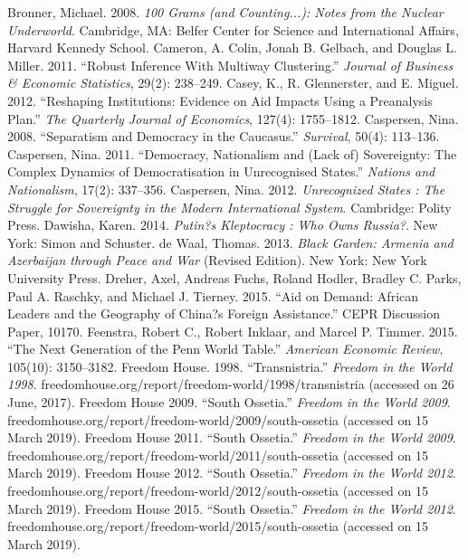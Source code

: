 \documentclass[12pt,a4paper]{article}%
\begin{document}
\begin{thebibliography}{99}
\bibitem{} Bronner, Michael. 2008. \textit{100 Grams (and Counting...): Notes from the Nuclear Underworld}. Cambridge, MA: Belfer Center for Science and International Affairs, Harvard Kennedy School.                                                                             
\bibitem{} Cameron, A. Colin, Jonah B. Gelbach, and Douglas L. Miller. 2011. ``Robust Inference With Multiway Clustering.'' \textit{Journal of Business \& Economic Statistics}, 29(2): 238--249.
\bibitem{} Casey, K., R. Glennerster, and E. Miguel. 2012. ``Reshaping Institutions: Evidence on Aid Impacts Using a Preanalysis Plan.'' \textit{The Quarterly Journal of Economics}, 127(4): 1755--1812.
\bibitem{} Caspersen, Nina. 2008. ``Separatism and Democracy in the Caucasus.'' \textit{Survival}, 50(4): 113--136.
\bibitem{} Caspersen, Nina. 2011. ``Democracy, Nationalism and (Lack of) Sovereignty: The Complex Dynamics of Democratisation in Unrecognised States.'' \textit{Nations and Nationalism}, 17(2): 337--356.
\bibitem{} Caspersen, Nina. 2012. \textit{Unrecognized States : The Struggle for Sovereignty in the Modern International System}. Cambridge: Polity Press.
\bibitem{} Dawisha, Karen. 2014. \textit{Putin?s Kleptocracy : Who Owns Russia?}. New York: Simon and Schuster.
\bibitem{} de Waal, Thomas. 2013. \textit{Black Garden: Armenia and Azerbaijan through Peace and War} (Revised Edition). New York: New York University Press.
\bibitem{} Dreher, Axel, Andreas Fuchs, Roland Hodler, Bradley C. Parks, Paul A. Raschky, and Michael J. Tierney. 2015. ``Aid on Demand: African Leaders and the Geography of China?s Foreign Assistance.'' CEPR Discussion Paper, 10170.
\bibitem{} Feenstra, Robert C., Robert Inklaar, and Marcel P. Timmer. 2015. ``The Next Generation of the Penn World Table.'' \textit{American Economic Review}, 105(10): 3150--3182.
\bibitem{} Freedom House. 1998. ``Transnistria.'' \textit{Freedom in the World 1998}. freedomhouse.org/report/freedom-world/1998/transnistria (accessed on 26 June, 2017). 
\bibitem{} Freedom House 2009. ``South Ossetia.'' \textit{Freedom in the World 2009}. freedomhouse.org/report/freedom-world/2009/south-ossetia (accessed on 15 March 2019).
\bibitem{} Freedom House 2011. ``South Ossetia.'' \textit{Freedom in the World 2009}. freedomhouse.org/report/freedom-world/2011/south-ossetia (accessed on 15 March 2019).
\bibitem{} Freedom House 2012. ``South Ossetia.'' \textit{Freedom in the World 2012}. freedomhouse.org/report/freedom-world/2012/south-ossetia (accessed on 15 March 2019).
\bibitem{} Freedom House 2015. ``South Ossetia.'' \textit{Freedom in the World 2012}. freedomhouse.org/report/freedom-world/2015/south-ossetia (accessed on 15 March 2019).

\end{thebibliography}
\end{document}
